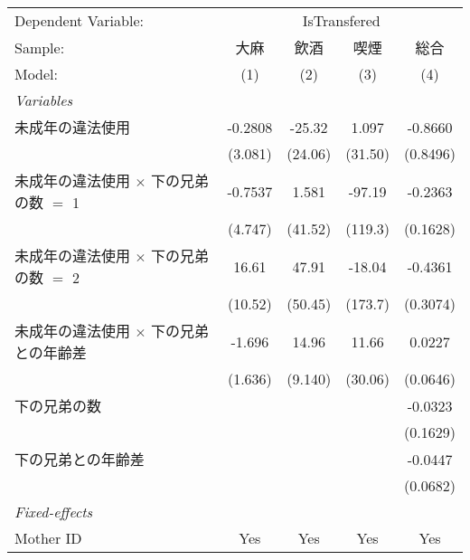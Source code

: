 \documentclass{article}
\begin{document}
\begin{landscape}


\begingroup
\centering
\begin{threeparttable}[b]
   \begin{tabular}{lcccc}
      \tabularnewline \midrule \midrule
      Dependent Variable: & \multicolumn{4}{c}{IsTransfered}\\
      Sample:                                       & 大麻    & 飲酒    & 喫煙    & 総合 \\   
      Model:                                        & (1)     & (2)     & (3)     & (4)\\  
      \midrule
      \emph{Variables}\\
      未成年の違法使用                              & -0.2808 & -25.32  & 1.097   & -0.8660\\   
                                                    & (3.081) & (24.06) & (31.50) & (0.8496)\\   
      未成年の違法使用 $\times$ 下の兄弟の数 $=$ 1  & -0.7537 & 1.581   & -97.19  & -0.2363\\   
                                                    & (4.747) & (41.52) & (119.3) & (0.1628)\\   
      未成年の違法使用 $\times$ 下の兄弟の数 $=$ 2  & 16.61   & 47.91   & -18.04  & -0.4361\\   
                                                    & (10.52) & (50.45) & (173.7) & (0.3074)\\   
      未成年の違法使用 $\times$ 下の兄弟との年齢差  & -1.696  & 14.96   & 11.66   & 0.0227\\   
                                                    & (1.636) & (9.140) & (30.06) & (0.0646)\\   
      下の兄弟の数                                  &         &         &         & -0.0323\\   
                                                    &         &         &         & (0.1629)\\   
      下の兄弟との年齢差                            &         &         &         & -0.0447\\   
                                                    &         &         &         & (0.0682)\\   
      \midrule
      \emph{Fixed-effects}\\
      Mother ID                                     & Yes     & Yes     & Yes     & Yes\\  

\end{tabular}
\end{threeparttable}
\end{landscape}
\end{document}
